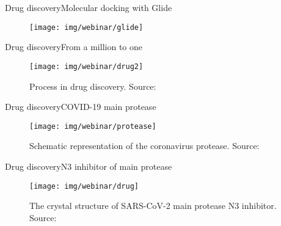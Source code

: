 \documentclass[10pt]{beamer}
\newcommand{\1}{
        	\setbeamertemplate{background}{
        		\texttt{[image: img/1]}
        		\tikz[overlay] \fill[fill opacity=0.75,fill=white] (0,0) rectangle (-\paperwidth,\paperheight);
        	}
}
\begin{document}
\begin{frame}{Drug discovery}{Molecular docking with Glide}
	\begin{figure}[]
		\centering
		\texttt{[image: img/webinar/glide]}
		\label{img:mot2}
	\end{figure}
\end{frame}

\begin{frame}{Drug discovery}{From a million to one}
	\begin{figure}[]
		\centering
		\texttt{[image: img/webinar/drug2]}
		\label{img:mot2}
		\caption{Process in drug discovery. Source: \cite{chanin2020}}
	\end{figure}
\end{frame}

\begin{frame}{Drug discovery}{COVID-19 main protease}
	\begin{figure}[]
		\centering
		\texttt{[image: img/webinar/protease]}
		\label{img:mot2}
		\caption{Schematic representation of the coronavirus protease. Source: \cite{zhang2020crystal}}
	\end{figure}
\end{frame}



\begin{frame}{Drug discovery}{N3 inhibitor of main protease}
	\begin{figure}[]
		\centering
		\texttt{[image: img/webinar/drug]}
		\label{img:mot2}
		\caption{The crystal structure of SARS-CoV-2 main protease N3 inhibitor. Source: \cite{jin2020structure}}
	\end{figure}
\end{frame}
\end{document}
